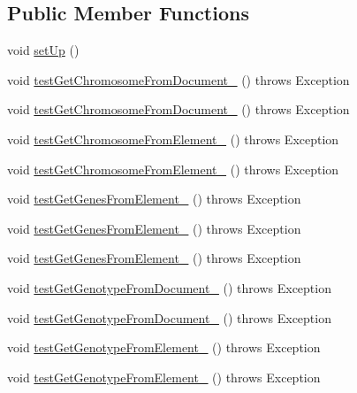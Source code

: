 \subsection*{Public Member Functions}
\begin{DoxyCompactItemize}
\item 
void \hyperlink{classorg_1_1jgap_1_1xml_1_1_x_m_l_manager_test_af66223a86e1f624566ccd9a174526319}{set\-Up} ()
\item 
void \hyperlink{classorg_1_1jgap_1_1xml_1_1_x_m_l_manager_test_a120cc96813e702eedec3b6fb527a47b9}{test\-Get\-Chromosome\-From\-Document\-\_} ()  throws Exception 
\item 
void \hyperlink{classorg_1_1jgap_1_1xml_1_1_x_m_l_manager_test_a86ea5d61eb6d4772e5e2c6b967cceec3}{test\-Get\-Chromosome\-From\-Document\-\_} ()  throws Exception 
\item 
void \hyperlink{classorg_1_1jgap_1_1xml_1_1_x_m_l_manager_test_a65c5dd87b6a721001e3638b6c16a975e}{test\-Get\-Chromosome\-From\-Element\-\_} ()  throws Exception 
\item 
void \hyperlink{classorg_1_1jgap_1_1xml_1_1_x_m_l_manager_test_ac31dc4f8cc743091e8d3697c8f8fe135}{test\-Get\-Chromosome\-From\-Element\-\_} ()  throws Exception 
\item 
void \hyperlink{classorg_1_1jgap_1_1xml_1_1_x_m_l_manager_test_acdd7b50bce4fda55324ee6aa8d261fa8}{test\-Get\-Genes\-From\-Element\-\_} ()  throws Exception 
\item 
void \hyperlink{classorg_1_1jgap_1_1xml_1_1_x_m_l_manager_test_ad282f6e2a0c83a833f453b49519eecd0}{test\-Get\-Genes\-From\-Element\-\_} ()  throws Exception 
\item 
void \hyperlink{classorg_1_1jgap_1_1xml_1_1_x_m_l_manager_test_aed2dabae37337b3f15f58508bbdbae91}{test\-Get\-Genes\-From\-Element\-\_} ()  throws Exception 
\item 
void \hyperlink{classorg_1_1jgap_1_1xml_1_1_x_m_l_manager_test_aba29e2518a2247a3e98c9c7a3e086658}{test\-Get\-Genotype\-From\-Document\-\_} ()  throws Exception 
\item 
void \hyperlink{classorg_1_1jgap_1_1xml_1_1_x_m_l_manager_test_a100fec0620b0aa17daa436ea40b77309}{test\-Get\-Genotype\-From\-Document\-\_} ()  throws Exception 
\item 
void \hyperlink{classorg_1_1jgap_1_1xml_1_1_x_m_l_manager_test_a397d5609e5540501b6829b5d9e107ef8}{test\-Get\-Genotype\-From\-Element\-\_} ()  throws Exception 
\item 
void \hyperlink{classorg_1_1jgap_1_1xml_1_1_x_m_l_manager_test_ac65c601529b2de0ec611566a918b3d30}{test\-Get\-Genotype\-From\-Element\-\_} ()  throws Exception 

\end{DoxyCompactItemize}
